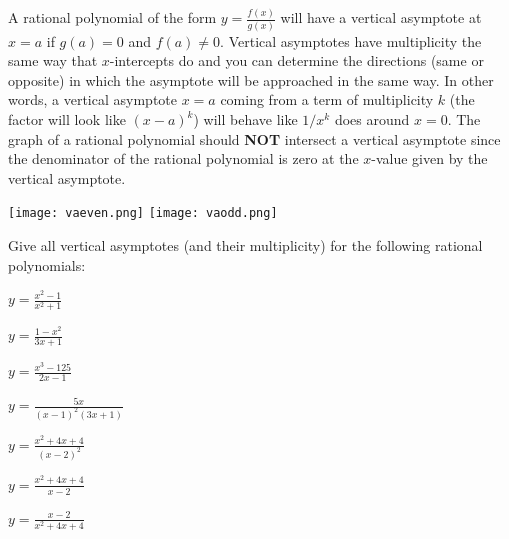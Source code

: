 \begin{info}
A rational polynomial of the form $y =\frac{f(x)}{g(x)}$ will have a vertical asymptote at $x=a$ if $g(a)=0$ and $f(a) \neq 0$. Vertical asymptotes have multiplicity the same way that $x$-intercepts do and you can determine the directions (same or opposite) in which the asymptote will be approached in the same way. In other words, a vertical asymptote $x=a$ coming from a term of multiplicity $k$ (the factor will look like $(x-a)^k$) will behave like $1/x^k$ does around $x=0$. The graph of a rational polynomial should \textbf{NOT} intersect a vertical asymptote since the denominator of the rational polynomial is zero at the $x$-value given by the vertical asymptote.

\begin{center} \texttt{[image: vaeven.png]} \texttt{[image: vaodd.png]} \end{center}
\end{info}
\bq Give all vertical asymptotes (and their multiplicity) for the following rational polynomials:
\be
\item $y=\frac{x^2-1}{x^2+1}$
\item $y=\frac{1-x^2}{3x+1}$
\item $y=\frac{x^3-125}{2x-1}$
\item $y=\frac{5x}{(x-1)^2(3x+1)}$
\item $y=\frac{x^2+4x+4}{(x-2)^2}$
\item $y=\frac{x^2+4x+4}{x-2}$
\item $y=\frac{x-2}{x^2+4x+4}$
\ee
\eq

